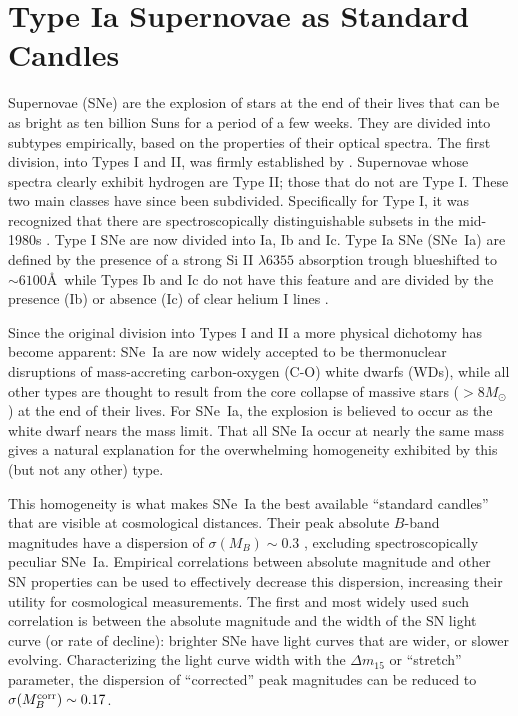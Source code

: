 \section{Type Ia Supernovae as Standard Candles}

Supernovae (SNe) are the explosion of stars at the end of their lives
that can be as bright as ten billion Suns for a period of a few
weeks. They are divided into subtypes empirically, based on the
properties of their optical spectra. The first division, into Types I
and II, was firmly established by \citet{minkowski41a}. Supernovae
whose spectra clearly exhibit hydrogen are Type II; those that do not
are Type I. These two main classes have since been
subdivided. Specifically for Type I, it was recognized that there are
spectroscopically distinguishable subsets in the mid-1980s
\citep{elias85a,panagia85a,wheeler85a,uomoto85a}. Type I SNe are now
divided into Ia, Ib and Ic. Type Ia SNe (SNe~Ia) are defined by the
presence of a strong Si II $\lambda6355$ absorption trough blueshifted
to $\sim 6100$\AA\ while Types Ib and Ic do not have this feature and
are divided by the presence (Ib) or absence (Ic) of clear helium I
lines \citep[see][for a review]{filippenko97a}.

Since the original division into Types I and II a more physical
dichotomy has become apparent: SNe~Ia are now widely accepted to be
thermonuclear disruptions of mass-accreting carbon-oxygen (C-O) white
dwarfs (WDs), while all other types are thought to result from the core
collapse of massive stars ($>8M_\odot$) at the end of their lives.
For SNe~Ia, the explosion is believed to occur as the white dwarf
nears the \citet{chandrasekhar31a} mass limit. That all SNe Ia occur at
nearly the same mass gives a natural explanation for the overwhelming
homogeneity exhibited by this (but not any other) type.

This homogeneity is what makes SNe~Ia the best available ``standard
candles'' that are visible at cosmological distances. Their peak
absolute $B$-band magnitudes have a dispersion of $\sigma(M_B) \sim
0.3$ \citep[e.g.,][]{hamuy96a}, excluding spectroscopically peculiar
SNe~Ia. Empirical correlations between absolute magnitude and other SN
properties can be used to effectively decrease this dispersion,
increasing their utility for cosmological measurements. The first and
most widely used such correlation is between the absolute
magnitude and the width of the SN light curve (or rate of decline):
brighter SNe have light curves that are wider, or
slower evolving. Characterizing the light curve width with the $\Delta
m_{15}$ \citep{phillips93a} or ``stretch''
\citep[$s$;][]{perlmutter97a} parameter, the dispersion of
``corrected'' peak magnitudes can be reduced to $\sigma(M_B^{\rm corr})
\sim 0.17$.

